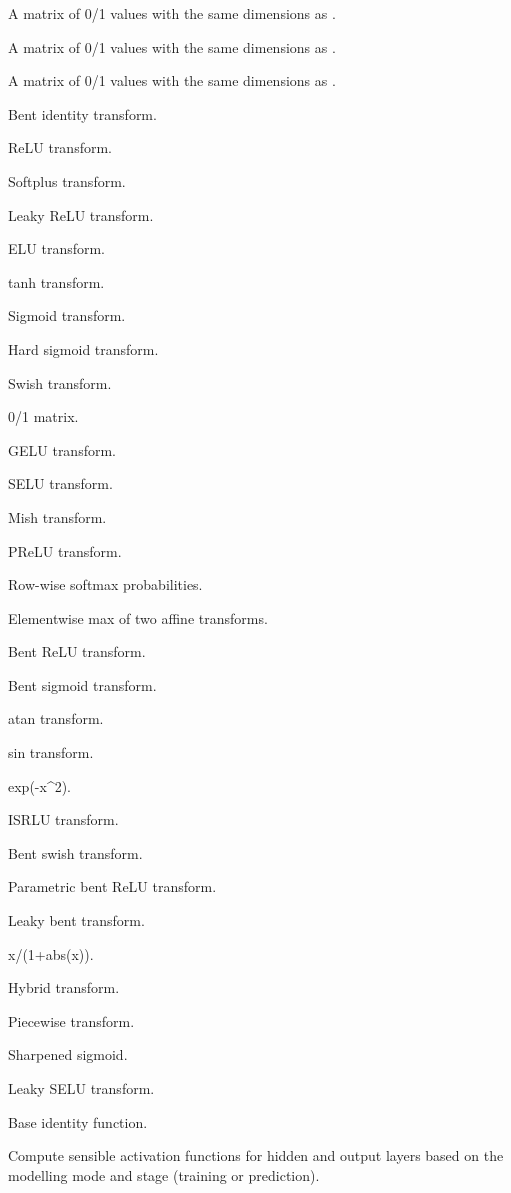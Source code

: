 \documentclass[a4paper]{book}
\begin{document}
\begin{Value}
A matrix of 0/1 values with the same dimensions as .

A matrix of 0/1 values with the same dimensions as .

A matrix of 0/1 values with the same dimensions as .

Bent identity transform.

ReLU transform.

Softplus transform.

Leaky ReLU transform.

ELU transform.

tanh transform.

Sigmoid transform.

Hard sigmoid transform.

Swish transform.

0/1 matrix.

GELU transform.

SELU transform.

Mish transform.

PReLU transform.

Row-wise softmax probabilities.

Elementwise max of two affine transforms.

Bent ReLU transform.

Bent sigmoid transform.

atan transform.

sin transform.

exp(-x\textasciicircum{}2).

ISRLU transform.

Bent swish transform.

Parametric bent ReLU transform.

Leaky bent transform.

x/(1+abs(x)).

Hybrid transform.

Piecewise transform.

Sharpened sigmoid.

Leaky SELU transform.

Base identity function.
\end{Value}
%
\begin{Description}
Compute sensible activation functions for hidden and output
layers based on the modelling mode and stage (training or prediction).
\end{Description}
\end{document}
